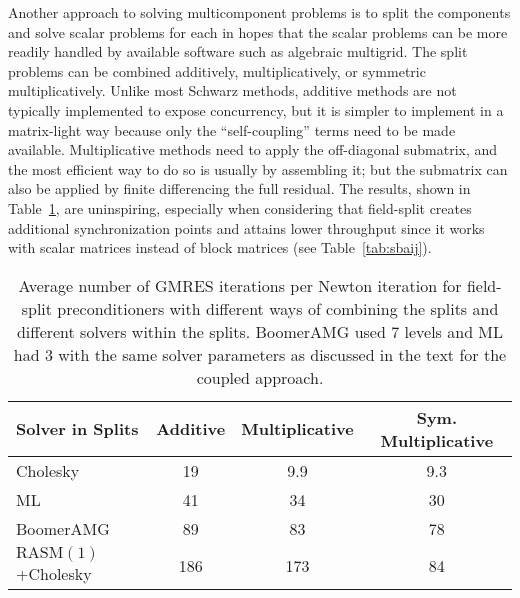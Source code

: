 \documentclass[final]{siamltex}
\newcommand{\RASM}{\mathrm{RASM}}
\begin{document}
Another approach to solving multicomponent problems is to split the components and solve scalar problems for each in hopes that the scalar problems can be more readily handled by available software such as algebraic multigrid.  The split problems can be combined additively, multiplicatively, or symmetric multiplicatively.  Unlike most Schwarz methods, additive methods are not typically implemented to expose concurrency, but it is simpler to implement in a matrix-light way because only the ``self-coupling'' terms need to be made available.  Multiplicative methods need to apply the off-diagonal submatrix, and the most efficient way to do so is usually by assembling it; but the submatrix can also be applied by finite differencing the full residual.  The results, shown in Table~\ref{tab:fieldsplit}, are uninspiring, especially when considering that field-split creates additional synchronization points and attains lower throughput since it works with scalar matrices instead of block matrices (see Table~\ref{tab:sbaij}).

\begin{table}
  \centering\caption{Average number of GMRES iterations per Newton iteration for field-split preconditioners with different ways of combining the splits and different solvers within the splits.
BoomerAMG used 7 levels and ML had 3 with the same solver parameters as discussed in the text for the coupled approach.}\label{tab:fieldsplit}
  \begin{tabular}{l|ccc}
    Solver in Splits    & Additive & Multiplicative & Sym. Multiplicative \\ \hline
    Cholesky            & 19       & 9.9            & 9.3                 \\
    ML                  & 41       & 34             & 30                  \\
    BoomerAMG           & 89       & 83             & 78                  \\
    $\RASM(1)$+Cholesky & 186      & 173            & 84
  \end{tabular}
\end{table}
\end{document}
